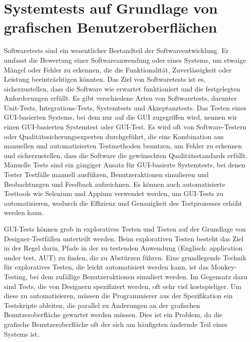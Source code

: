 \section{Systemtests auf Grundlage von grafischen Benutzeroberflächen}
\label{sec:Foundations:GUIBasedSystemTests}
Softwaretests sind ein wesentlicher Bestandteil der Softwareentwicklung.
Er umfasst die Bewertung einer Softwareanwendung oder eines Systems, um etwaige Mängel oder Fehler zu erkennen, die die Funktionalität, Zuverlässigkeit oder Leistung beeinträchtigen könnten.
Das Ziel von Softwaretests ist es, sicherzustellen, dass die Software wie erwartet funktioniert und die festgelegten Anforderungen erfüllt.
Es gibt verschiedene Arten von Softwaretests, darunter Unit-Tests, Integrations-Tests, Systemtests und Akzeptanztests.
Das Testen eines GUI-basierten Systems, bei dem nur auf die GUI zugegriffen wird, nennen wir einen GUI-basierten Systemtest oder GUI-Test.
Es wird oft von Software-Testern oder Qualitätssicherungsexperten durchgeführt, die eine Kombination aus manuellen und automatisierten Testmethoden benutzen, um Fehler zu erkennen und sicherzustellen, dass die Software die gewünschten Qualitätsstandards erfüllt.
Manuelle Tests sind ein gängiger Ansatz für GUI-basierte Systemtests, bei denen Tester Testfälle manuell ausführen, Benutzeraktionen simulieren und Beobachtungen und Feedback aufzeichnen.
Es können auch automatisierte Testtools wie Selenium und Appium verwendet werden, um GUI-Tests zu automatisieren, wodurch die Effizienz und Genauigkeit des Testprozesses erhöht werden kann.

GUI-Tests können grob in exploratives Testen und Testen auf der Grundlage von Designer-Testfällen unterteilt werden.
Beim explorativen Testen besteht das Ziel in der Regel darin, Pfade in der zu testenden Anwendung (Englisch: application under test, AUT) zu finden, die zu Abstürzen führen.
Eine grundlegende Technik für exploratives Testen, die leicht automatisiert werden kann, ist das Monkey-Testing, bei dem zufällige Benutzeraktionen simuliert werden.
Im Gegensatz dazu sind Tests, die von Designern spezifiziert werden, oft sehr viel kostspieliger.
Um diese zu automatisieren, müssen die Programmierer aus der Spezifikation ein Testskripte ableiten, die parallel zu Änderungen an der grafischen Benutzeroberfläche gewartet werden müssen.
Dies ist ein Problem, da die grafische Benutzeroberfläche oft der sich am häufigsten ändernde Teil eines Systems ist.

